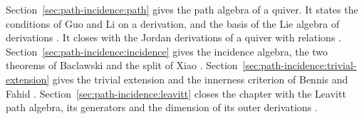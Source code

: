 
Section~\ref{sec:path-incidence:path} gives the path algebra of a quiver. It states
the conditions of Guo and Li on a derivation, and the basis of the Lie algebra of
derivations \cite[Theorem~3.4, p.~555]{GuoLi2014}. It closes with the Jordan
derivations of a quiver with relations \cite[Theorem~3.4, p.~85]{LiWei2018}.
Section~\ref{sec:path-incidence:incidence} gives the incidence algebra, the two
theorems of Baclawski \cite[pp.~352, 354]{Baclawski1972} and the split of Xiao
\cite[Proposition~2.5, p.~1362]{Xiao2015}.
Section~\ref{sec:path-incidence:trivial-extension} gives the trivial extension and
the innerness criterion of Bennis and Fahid
\cite[Theorem~3.12, p.~14]{BennisFahid2017}.
Section~\ref{sec:path-incidence:leavitt} closes the chapter with the Leavitt path
algebra, its generators and the dimension of its outer derivations
\cite[Corollary~3.8, p.~79]{Lopatkin2019}.
